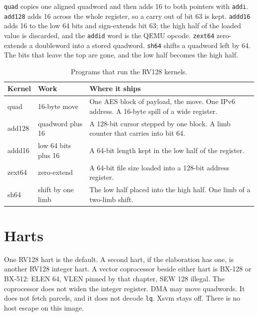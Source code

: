 \texttt{quad} copies one aligned quadword and then adds 16 to both pointers with \texttt{addi}. \texttt{add128} adds 16 across the whole register, so a carry out of bit 63 is kept. \texttt{addd16} adds 16 to the low 64 bits and sign-extends bit 63; the high half of the loaded value is discarded, and the \texttt{addid} word is the QEMU opcode. \texttt{zext64} zero-extends a doubleword into a stored quadword. \texttt{sh64} shifts a quadword left by 64. The bits that leave the top are gone, and the low half becomes the high half.

\begin{table}[htbp]
\centering
\caption{Programs that run the RV128 kernels.}
\begingroup
\scriptsize
\setlength{\tabcolsep}{3pt}
\begin{tabular}{@{}llp{7.2cm}@{}}
\toprule
Kernel & Work & Where it ships \\
\midrule
quad & 16-byte move & One AES block of payload, the move. One IPv6 address. A 16-byte spill of a wide register. \\
add128 & quadword plus 16 & A 128-bit cursor stepped by one block. A limb counter that carries into bit 64. \\
addd16 & low 64 bits plus 16 & A 64-bit length kept in the low half of the register. \\
zext64 & zero-extend & A 64-bit file size loaded into a 128-bit address register. \\
sh64 & shift by one limb & The low half placed into the high half. One limb of a two-limb shift. \\
\bottomrule
\end{tabular}
\endgroup
\end{table}







\section{Harts}

One RV128 hart is the default. A second hart, if the elaboration has one, is another RV128 integer hart. A vector coprocessor beside either hart is BX-128 or BX-512: ELEN 64, VLEN pinned by that chapter, SEW 128 illegal. The coprocessor does not widen the integer register. DMA may move quadwords. It does not fetch parcels, and it does not decode \texttt{lq}. Xsvm stays off. There is no host escape on this image.
